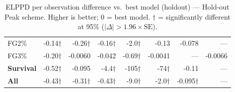 \documentclass{article}
\begin{document}
\begin{table}[H]
{\begin{tabular}{lrrrrrrr}
FG2\% & -0.14$\dagger$ & -0.26$\dagger$ & -0.16$\dagger$ & -2.0$\dagger$ & -0.13 & -0.078 & --- \\[2pt]
FG3\% & -0.20$\dagger$ & -0.0060 & -0.042 & -0.69$\dagger$ & -0.0041 & --- & -0.0066 \\[2pt]
\midrule
\textbf{Survival} & -0.52$\dagger$ & -0.095 & -4.4$\dagger$ & -105$\dagger$ & -74$\dagger$ & -0.11 & --- \\
\midrule
\textbf{All} & -0.43$\dagger$ & -0.31$\dagger$ & -0.43$\dagger$ & -9.0$\dagger$ & -2.0$\dagger$ & -0.095$\dagger$ & --- \\
\bottomrule
\end{tabular}
}
\caption{ELPPD per observation difference vs.\ best model (holdout) --- Hold-out Peak scheme. Higher is better; 0 = best model. $\dagger$ = significantly different at 95\% ($|\Delta|>1.96\times\mathrm{SE}$).}
\label{tab:elppd_holdout_peak}
\end{table}
\end{document}
